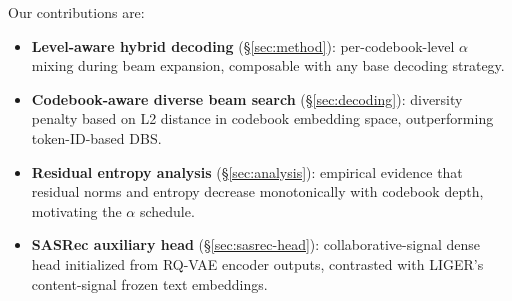 Our contributions are:
\begin{itemize}
  \item \textbf{Level-aware hybrid decoding} (§\ref{sec:method}): per-codebook-level $\alpha$ mixing during beam expansion, composable with any base decoding strategy.
  \item \textbf{Codebook-aware diverse beam search} (§\ref{sec:decoding}): diversity penalty based on L2 distance in codebook embedding space, outperforming token-ID-based DBS.
  \item \textbf{Residual entropy analysis} (§\ref{sec:analysis}): empirical evidence that residual norms and entropy decrease monotonically with codebook depth, motivating the $\alpha$ schedule.
  \item \textbf{SASRec auxiliary head} (§\ref{sec:sasrec-head}): collaborative-signal dense head initialized from RQ-VAE encoder outputs, contrasted with LIGER's content-signal frozen text embeddings.
\end{itemize}
